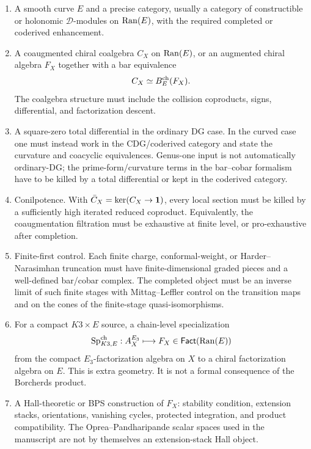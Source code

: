 \begin{enumerate}
\item A smooth curve \(E\) and a precise category, usually a category of
constructible or holonomic \(\mathcal D\)-modules on \(\operatorname{Ran}(E)\), with
the required completed or coderived enhancement.

\item A coaugmented chiral coalgebra \(C_X\) on \(\operatorname{Ran}(E)\), or an
augmented chiral algebra \(F_X\) together with a bar equivalence
\[
        C_X \simeq B^{\mathrm{ch}}_E(F_X).
\]
The coalgebra structure must include the collision coproducts, signs,
differential, and factorization descent.

\item A square-zero total differential in the ordinary DG case.  In the
curved case one must instead work in the CDG/coderived category and
state the curvature and coacyclic equivalences.  Genus-one input is not
automatically ordinary-DG; the prime-form/curvature terms in the
bar--cobar formalism have to be killed by a total differential or kept
in the coderived category.

\item Conilpotence.  With \(\bar C_X=\ker(C_X\to{\bf 1})\), every local
section must be killed by a sufficiently high iterated reduced
coproduct.  Equivalently, the coaugmentation filtration must be
exhaustive at finite level, or pro-exhaustive after completion.

\item Finite-first control.  Each finite charge, conformal-weight, or
Harder--Narasimhan truncation must have finite-dimensional graded
pieces and a well-defined bar/cobar complex.  The completed object must
be an inverse limit of such finite stages with Mittag--Leffler control
on the transition maps and on the cones of the finite-stage
quasi-isomorphisms.

\item For a compact \(K3\times E\) source, a chain-level specialization
\[
        \mathrm{Sp}^{\mathrm{ch}}_{K3,E}: A_X^{E_3}\longmapsto F_X\in \mathsf{Fact}(\operatorname{Ran}(E))
\]
from the compact \(E_3\)-factorization algebra on \(X\) to a chiral
factorization algebra on \(E\).  This is extra geometry.  It is not a
formal consequence of the Borcherds product.

\item A Hall-theoretic or BPS construction of \(F_X\): stability
condition, extension stacks, orientations, vanishing cycles, protected
integration, and product compatibility.  The Oprea--Pandharipande scalar
spaces used in the manuscript are not by themselves an extension-stack
Hall object.
\end{enumerate}

